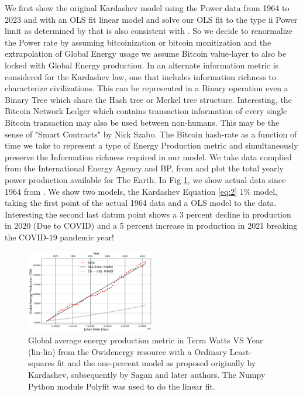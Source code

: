 \documentclass[final,5p,times,twocolumn,authoryear]{elsarticle}
\begin{document}
We first show the original Kardashev model using the Power data from 1964 to 2023 and with an OLS fit linear model and solve our OLS fit to the type ii Power limit as determined by \cite{kar64} that is also consistent with \cite{sagan73}. So we decide to renormalize the Power rate by assuming bitcoinization or bitcoin monitization and the extrapolation of Global Energy usage we assume Bitcoin value-layer to also be locked with Global Energy production. In \cite{sagan73} an alternate information metric is considered for the Kardashev law, one that includes information richness to characterize civilizations. This can be represented in a Binary operation even a Binary Tree which share the Hash tree or Merkel tree structure. Interesting, the Bitcoin Network Ledger which contains transaction information of every single Bitcoin transaction may also be used between non-humans. This may be the sense of "Smart Contracts" by Nick Szabo. The Bitcoin hash-rate as a function of time we take to represent a type of Energy Production metric and simultaneously preserve the Information richness required in our model. We take data complied from the International Energy Agency and BP, from \cite{owidenergy} and plot the total yearly power production available for The Earth. In Fig \ref{fig:kardashev1}, we show actual data since 1964 from \cite{owidenergy}. We show two models, the Kardashev Equation \ref{eq:2} 1\% model, taking the first point of the actual 1964 data and a OLS model to the data. Interesting the second last datum point shows a 3 percent decline in production in 2020 (Due to COVID) and a 5 percent increase in production in 2021 breaking the COVID-19 pandemic year!
\begin{figure}
    \centering
    \includegraphics[width=0.5\textwidth]{figs/fig1_kar2ff.jpg}
    \caption{Global average energy production metric in Terra Watts VS Year (lin-lin) from the Owidenergy resource with a Ordinary Least-squares fit and the one-percent model as proposed originally by Kardashev, subsequently by Sagan and later authors. The Numpy Python module Polyfit was used to do the linear fit.}
    \label{fig:kardashev1}

\end{figure}
\end{document}
